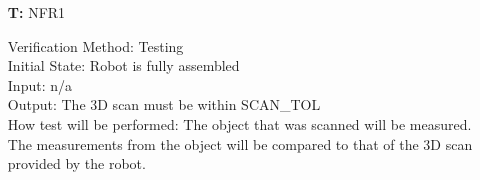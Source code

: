 \documentclass[12pt, titlepage]{article}
\newcounter{tnum} %
\begin{document}
\begin{itemize}

\item[\textbf{T\refstepcounter{tnum}\thetnum:}]{NFR1\\}

Verification Method: Testing	\\				
Initial State: Robot is fully assembled	\\			
Input: n/a\\
Output: The 3D scan must be within SCAN\_TOL \\
How test will be performed: The object that was scanned will be measured. The measurements from the object will be compared to that of the 3D scan provided by the robot.\\

\end{itemize}
  
\end{document}
